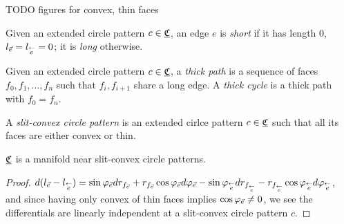 TODO figures for convex, thin faces

\begin{definition}
Given an extended circle pattern $c\in {\underline{\mathfrak{C}}}$, an edge $e$ is \emph{short}
if it has length 0, $l_{\vec{e}} = l_{\overset{\leftarrow}{e}} = 0$;
it is \emph{long} otherwise.
\end{definition}


\begin{definition}
Given an extended circle pattern $c\in {\underline{\mathfrak{C}}}$, a \emph{thick path}
is a sequence of faces $f_0,f_1,\ldots,f_n$
such that $f_i,f_{i+1}$ share a long edge.
A \emph{thick cycle} is a thick path with $f_0 = f_n$.
\end{definition}


\begin{definition}
A \emph{slit-convex circle pattern} is an extended cirlce pattern
$c \in {\underline{\mathfrak{C}}}$ such that all its faces are either convex or thin.
\end{definition}

\begin{lemma}
${\underline{\mathfrak{C}}}$ is a manifold near slit-convex circle patterns.
\end{lemma}

\begin{proof}
$d(l_{\vec{e}} - l_{\overset{\leftarrow}{e}})
= \sin \varphi_{\vec{e}} d r_{f_{\vec{e}}}
+ r_{f_{\vec{e}}} \cos \varphi_{\vec{e}} d \varphi_{\vec{e}}
- \sin \varphi_{\overset{\leftarrow}{e}} d r_{f_{\overset{\leftarrow}{e}}}
- r_{f_{\overset{\leftarrow}{e}}} \cos \varphi_{\overset{\leftarrow}{e}} d \varphi_{\overset{\leftarrow}{e}}
$,
and since having only convex of thin faces implies
$\cos \varphi_{\vec{e}} \neq 0$,
we see the differentials are linearly independent at
a slit-convex circle pattern $c$.
\end{proof}


